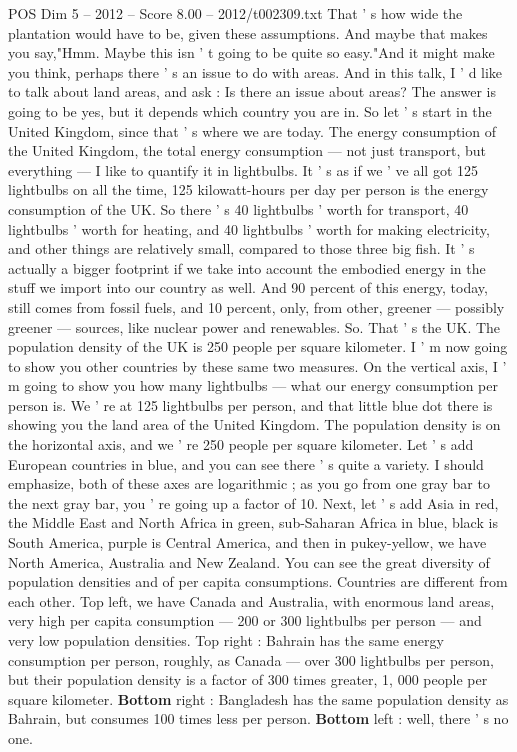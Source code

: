 \begin{textsample}{POS Dim 5 – 2012 – Score 8.00 – 2012/t002309.txt}
That ' s how wide the plantation would have to be, given these assumptions.
And maybe that makes you say,"Hmm.
Maybe this isn ' t going to be quite so easy."And it might make you think, perhaps there ' s an issue to do with areas.
And in this talk, I ' d like to talk about land areas, and ask : Is there an issue about areas?
The answer is going to be yes, but it depends which country you are in.
So let ' s start in the United Kingdom, since that ' s where we are today.
The energy consumption of the United Kingdom, the total energy consumption — not just transport, but everything — I like to quantify it in lightbulbs.
It ' s as if we ' ve all got 125 lightbulbs on all the time, 125 kilowatt-hours per day per person is the energy consumption of the UK.
So there ' s 40 lightbulbs ' worth for transport, 40 lightbulbs ' worth for heating, and 40 lightbulbs ' worth for making electricity, and other things are relatively small, compared to those three big fish.
It ' s actually a bigger footprint if we take into account the embodied energy in the stuff we import into our country as well.
And 90 percent of this energy, today, still comes from fossil fuels, and 10 percent, only, from other, greener — possibly greener — sources, like nuclear power and renewables.
So.
That ' s the UK.
The population density of the UK is 250 people per square kilometer.
I ' m now going to show you other countries by these same two measures.
On the vertical axis, I ' m going to show you how many lightbulbs — what our energy consumption per person is.
We ' re at 125 lightbulbs per person, and that little blue dot there is showing you the land area of the United Kingdom.
The population density is on the horizontal axis, and we ' re 250 people per square kilometer.
Let ' s add European countries in blue, and you can see there ' s quite a variety.
I should emphasize, both of these axes are logarithmic ; as you go from one gray bar to the next gray bar, you ' re going up a factor of 10.
Next, let ' s add Asia in red, the Middle East and North Africa in green, sub-Saharan Africa in blue, black is South America, purple is Central America, and then in pukey-yellow, we have North America, Australia and New Zealand.
You can see the great diversity of population densities and of per capita consumptions.
Countries are different from each other.
Top left, we have Canada and Australia, with enormous land areas, very high per capita consumption — 200 or 300 lightbulbs per person — and very low population densities.
Top right : Bahrain has the same energy consumption per person, roughly, as Canada — over 300 lightbulbs per person, but their population density is a factor of 300 times greater, 1, 000 people per square kilometer. \textbf{Bottom} right : Bangladesh has the same population density as Bahrain, but consumes 100 times less per person. \textbf{Bottom} left : well, there ' s no one.

\end{textsample}
